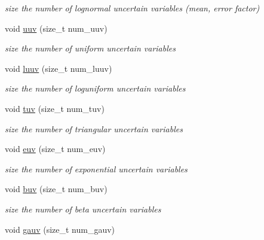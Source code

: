 \begin{DoxyCompactItemize}
\begin{DoxyCompactList}\small\item\em size the number of lognormal uncertain variables (mean, error factor) \end{DoxyCompactList}\item 
void \hyperlink{classPecos_1_1AleatoryDistParams_a59c3f3ee1b31cc924e623590fb8d0abc}{uuv} (size\+\_\+t num\+\_\+uuv)\label{classPecos_1_1AleatoryDistParams_a59c3f3ee1b31cc924e623590fb8d0abc}

\begin{DoxyCompactList}\small\item\em size the number of uniform uncertain variables \end{DoxyCompactList}\item 
void \hyperlink{classPecos_1_1AleatoryDistParams_a5c24d0ae4f81f344f56643ff74a4798e}{luuv} (size\+\_\+t num\+\_\+luuv)\label{classPecos_1_1AleatoryDistParams_a5c24d0ae4f81f344f56643ff74a4798e}

\begin{DoxyCompactList}\small\item\em size the number of loguniform uncertain variables \end{DoxyCompactList}\item 
void \hyperlink{classPecos_1_1AleatoryDistParams_ae0c0688178b8472d518ead2126106c22}{tuv} (size\+\_\+t num\+\_\+tuv)\label{classPecos_1_1AleatoryDistParams_ae0c0688178b8472d518ead2126106c22}

\begin{DoxyCompactList}\small\item\em size the number of triangular uncertain variables \end{DoxyCompactList}\item 
void \hyperlink{classPecos_1_1AleatoryDistParams_aece092312bd379ca6e1b25d01bbd8832}{euv} (size\+\_\+t num\+\_\+euv)\label{classPecos_1_1AleatoryDistParams_aece092312bd379ca6e1b25d01bbd8832}

\begin{DoxyCompactList}\small\item\em size the number of exponential uncertain variables \end{DoxyCompactList}\item 
void \hyperlink{classPecos_1_1AleatoryDistParams_afec086a7931e8dfd46a421cbd17d930d}{buv} (size\+\_\+t num\+\_\+buv)\label{classPecos_1_1AleatoryDistParams_afec086a7931e8dfd46a421cbd17d930d}

\begin{DoxyCompactList}\small\item\em size the number of beta uncertain variables \end{DoxyCompactList}\item 
void \hyperlink{classPecos_1_1AleatoryDistParams_a2ebbb5bc01383f37a59f9696355b652f}{gauv} (size\+\_\+t num\+\_\+gauv)\label{classPecos_1_1AleatoryDistParams_a2ebbb5bc01383f37a59f9696355b652f}


\end{DoxyCompactItemize}
